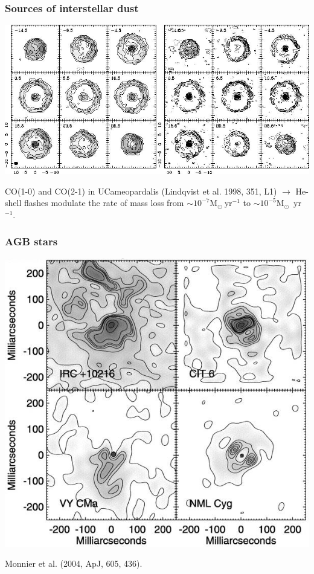 \begin{frame}\frametitle{Sources of interstellar dust}

\begin{center}
\includegraphics[width=\textwidth,height=!]{./D/thinCOshell.jpg}
\end{center}
CO(1-0) and CO(2-1) in UCameopardalis (Lindqvist et al. 1998, 351, L1)
$\rightarrow$ He-shell flashes modulate the rate of mass loss from
$\sim10^{-7}$M$_\odot~$yr$^{-1}$ to $\sim10^{-5}$M$_\odot$~yr$^{-1}$.

\end{frame}
\begin{frame}\frametitle{AGB stars}

\begin{center}
\includegraphics[width=!,height=0.6\textwidth]{./D/irc+10216_iota_1998.jpg}
\end{center}
Monnier et al. (2004, ApJ, 605, 436).

\end{frame}
